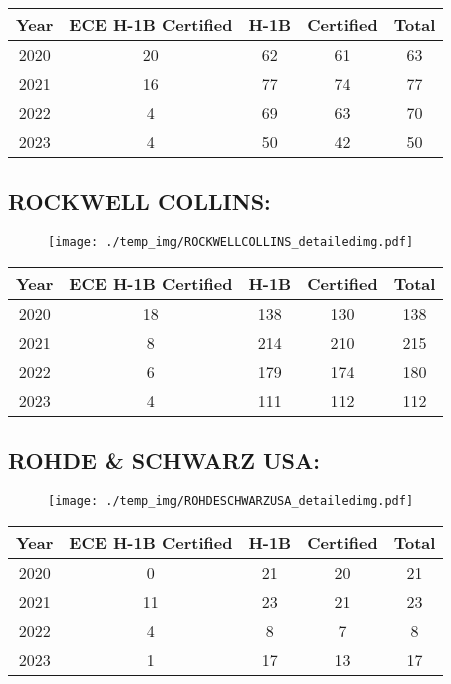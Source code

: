 \documentclass{article}%
\begin{document}
%
\begin{longtable}{c|c|c|c|c}%
\hline%
Year&ECE H{-}1B Certified&H{-}1B&Certified&Total\\%
\hline%
2020&20&62&61&63\\%
\hline%
2021&16&77&74&77\\%
\hline%
2022&4&69&63&70\\%
\hline%
2023&4&50&42&50\\%
\hline%
\end{longtable}

%
\newpage%
\subsection{ROCKWELL COLLINS:}%
\label{subsec:ROCKWELLCOLLINS}%
\label{ROCKWELLCOLLINSdetailed}%


\begin{figure}[htbp]%
\centering%
\texttt{[image: ./temp\_img/ROCKWELLCOLLINS\_detailedimg.pdf]}%
\end{figure}

%
\begin{longtable}{c|c|c|c|c}%
\hline%
Year&ECE H{-}1B Certified&H{-}1B&Certified&Total\\%
\hline%
2020&18&138&130&138\\%
\hline%
2021&8&214&210&215\\%
\hline%
2022&6&179&174&180\\%
\hline%
2023&4&111&112&112\\%
\hline%
\end{longtable}

%
\newpage%
\subsection{ROHDE \& SCHWARZ USA:}%
\label{subsec:ROHDESCHWARZUSA}%
\label{ROHDESCHWARZUSAdetailed}%


\begin{figure}[htbp]%
\centering%
\texttt{[image: ./temp\_img/ROHDESCHWARZUSA\_detailedimg.pdf]}%
\end{figure}

%
\begin{longtable}{c|c|c|c|c}%
\hline%
Year&ECE H{-}1B Certified&H{-}1B&Certified&Total\\%
\hline%
2020&0&21&20&21\\%
\hline%
2021&11&23&21&23\\%
\hline%
2022&4&8&7&8\\%
\hline%
2023&1&17&13&17\\%
\hline%
\end{longtable}
\end{document}
